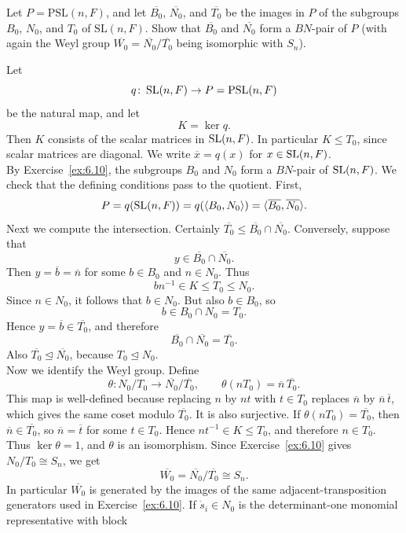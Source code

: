 \documentclass[../Odyssey_Project.tex]{subfiles}
\begin{document}
\begin{exercise}
\label{ex:6.11}
Let $P = \mathrm{PSL}(n,F)$, and let $\overline{B_0}$, $\overline{N_0}$, and $\overline{T_0}$ be the images in $P$ of the subgroups $B_0$, $N_0$, and $T_0$ of $\mathrm{SL}(n,F)$. Show that $\overline{B_0}$ and $\overline{N_0}$ form a $BN$-pair of $P$ (with again the Weyl group $\overline{W_0} = \overline{N_0}/\overline{T_0}$ being isomorphic with $S_n$).
\end{exercise}
\begin{solution}
Let
\[
    q\colon \operatorname{SL}(n,F)\to P=\mathrm{PSL}(n,F)
\]
be the natural map, and let
\[
    K=\ker q.
\]
Then $K$ consists of the scalar matrices in $\operatorname{SL}(n,F)$. In particular $K\leq T_0$, since scalar matrices are diagonal. We write $\overline{x}=q(x)$ for $x\in\operatorname{SL}(n,F)$.\\
By Exercise~\ref{ex:6.10}, the subgroups $B_0$ and $N_0$ form a $BN$-pair of $\operatorname{SL}(n,F)$. We check that the defining conditions pass to the quotient. First,
\[
    P=q(\operatorname{SL}(n,F))
    =
    q(\langle B_0,N_0\rangle)
    =
    \langle \overline{B_0},\overline{N_0}\rangle.
\]
Next we compute the intersection. Certainly $\overline{T_0}\leq \overline{B_0}\cap\overline{N_0}$. Conversely, suppose that
\[
    y\in \overline{B_0}\cap\overline{N_0}.
\]
Then $y=\overline{b}=\overline{n}$ for some $b\in B_0$ and $n\in N_0$. Thus
\[
    bn^{-1}\in K\leq T_0\leq N_0.
\]
Since $n\in N_0$, it follows that $b\in N_0$. But also $b\in B_0$, so
\[
    b\in B_0\cap N_0=T_0.
\]
Hence $y=\overline{b}\in\overline{T_0}$, and therefore
\[
    \overline{B_0}\cap\overline{N_0}=\overline{T_0}.
\]
Also $\overline{T_0}\trianglelefteq\overline{N_0}$, because $T_0\trianglelefteq N_0$.\\
Now we identify the Weyl group. Define
\[
    \theta\colon N_0/T_0\to \overline{N_0}/\overline{T_0},
    \qquad
    \theta(nT_0)=\overline{n}\,\overline{T_0}.
\]
This map is well-defined because replacing $n$ by $nt$ with $t\in T_0$ replaces $\overline n$ by $\overline n\,\overline t$, which gives the same coset modulo $\overline{T_0}$. It is also surjective. If $\theta(nT_0)=\overline{T_0}$, then $\overline{n}\in\overline{T_0}$, so $\overline{n}=\overline{t}$ for some $t\in T_0$. Hence $nt^{-1}\in K\leq T_0$, and therefore $n\in T_0$. Thus $\ker\theta=1$, and $\theta$ is an isomorphism. Since Exercise~\ref{ex:6.10} gives $N_0/T_0\cong S_n$, we get
\[
    \overline{W_0}
    =
    \overline{N_0}/\overline{T_0}
    \cong S_n.
\]
In particular $\overline{W_0}$ is generated by the images of the same adjacent-transposition generators used in Exercise~\ref{ex:6.10}. If $\dot{s}_i\in N_0$ is the determinant-one monomial representative with block

\end{solution}
\end{document}
